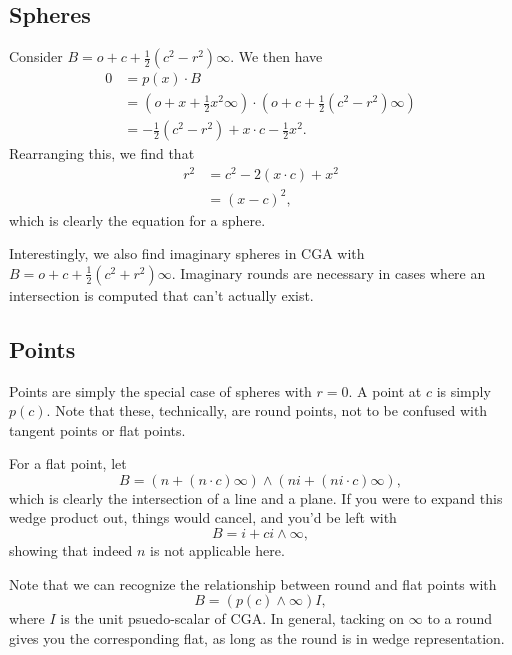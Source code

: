\documentclass[12pt]{article}
\newcommand{\nvao}{o}
\newcommand{\nvai}{\infty}
\begin{document}
\subsection*{Spheres}

Consider $B=\nvao + c + \frac{1}{2}(c^2 - r^2)\nvai$.  We then have
\begin{align*}
0 &= p(x)\cdot B \\
 &= \left(\nvao + x + \frac{1}{2}x^2\nvai\right)\cdot\left(\nvao + c + \frac{1}{2}(c^2 - r^2)\nvai\right) \\
 &= -\frac{1}{2}(c^2 - r^2) + x\cdot c - \frac{1}{2}x^2.
\end{align*}
Rearranging this, we find that
\begin{align*}
r^2 &= c^2 - 2(x\cdot c) + x^2 \\
 &= (x-c)^2,
\end{align*}
which is clearly the equation for a sphere.

Interestingly, we also find imaginary spheres in CGA with $B=\nvao + c + \frac{1}{2}(c^2 + r^2)\nvai$.
Imaginary rounds are necessary in cases where an intersection is computed that can't actually exist.

\subsection*{Points}

Points are simply the special case of spheres with $r=0$.  A point at $c$ is simply $p(c)$.
Note that these, technically, are round points, not to be confused with tangent points
or flat points.

For a flat point, let
\begin{equation*}
B = (n + (n\cdot c)\nvai)\wedge(ni + (ni\cdot c)\nvai),
\end{equation*}
which is clearly the intersection of a line and a plane.  If you were to expand
this wedge product out, things would cancel, and you'd be left with
\begin{equation*}
B = i + ci\wedge\nvai,
\end{equation*}
showing that indeed $n$ is not applicable here.

Note that we can recognize the relationship between round and flat points with
\begin{equation*}
B = (p(c)\wedge\nvai)I,
\end{equation*}
where $I$ is the unit psuedo-scalar of CGA.  In general, tacking on $\nvai$ to a round gives you
the corresponding flat, as long as the round is in wedge representation.
\end{document}
